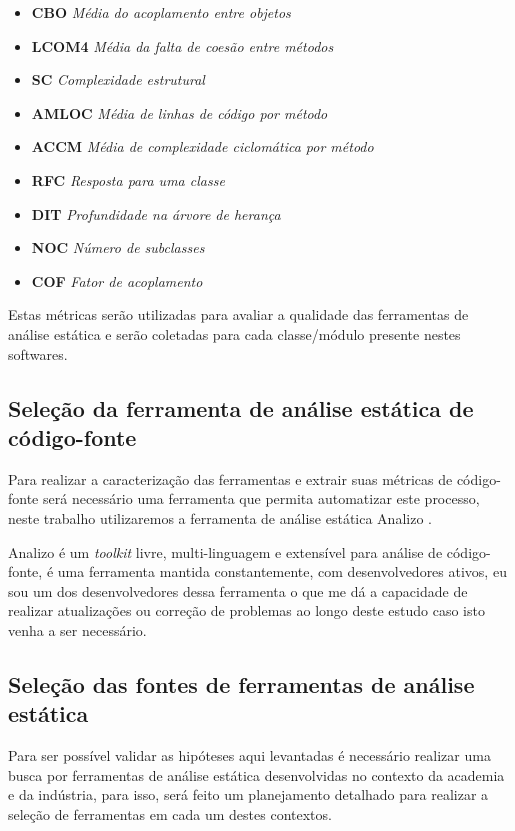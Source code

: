 \documentclass[qual, classic, a4paper]{ufbathesis}
\begin{document}
\begin{itemize}
  \item {\bf CBO} {\it Média do acoplamento entre objetos}
  \item {\bf LCOM4} {\it Média da falta de coesão entre métodos}
  \item {\bf SC} {\it Complexidade estrutural}
  \item {\bf AMLOC} {\it Média de linhas de código por método}
  \item {\bf ACCM} {\it Média de complexidade ciclomática por método}
  \item {\bf RFC} {\it Resposta para uma classe }
  \item {\bf DIT} {\it Profundidade na árvore de herança}
  \item {\bf NOC} {\it Número de subclasses}
  \item {\bf COF} {\it Fator de acoplamento}
\end{itemize}

Estas métricas serão utilizadas para avaliar a qualidade das ferramentas de
análise estática e serão coletadas para cada classe/módulo presente nestes
softwares.

\subsection{Seleção da ferramenta de análise estática de código-fonte}

Para realizar a caracterização das ferramentas e extrair suas métricas de
código-fonte será necessário uma ferramenta que permita automatizar este
processo, neste trabalho utilizaremos a ferramenta de análise estática Analizo
\cite{Terceiro2010}.

Analizo é um {\it toolkit} livre, multi-linguagem e extensível para análise de
código-fonte, é uma ferramenta mantida constantemente, com desenvolvedores
ativos, eu sou um dos desenvolvedores dessa ferramenta o que me dá a
capacidade de realizar atualizações ou correção de problemas ao longo deste
estudo caso isto venha a ser necessário.

\subsection{Seleção das fontes de ferramentas de análise estática}\label{levantamento}

Para ser possível validar as hipóteses aqui levantadas é necessário realizar
uma busca por ferramentas de análise estática desenvolvidas no contexto da
academia e da indústria, para isso, será feito um planejamento detalhado para
realizar a seleção de ferramentas em cada um destes contextos.
\end{document}
